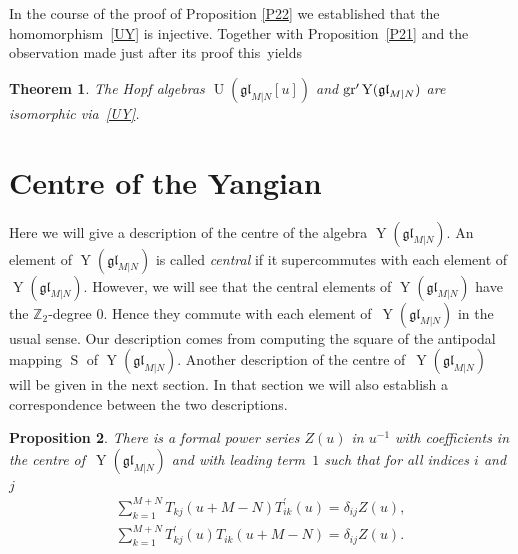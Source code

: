 \documentclass[10pt,a4paper]{amsart}
\numberwithin{equation}{section}
\newtheorem{Theorem}{Theorem}[section]
\newtheorem{Proposition}[Theorem]{Proposition}
\def\g{\glMN [u]}
\def\glMN{\mathfrak{gl}_{M|N}}
\def\grpr{{\rm gr}^{\prime} }
\def\S{\operatorname{S}}
\def\TP{T^{\prime}}
\def\Ug{\operatorname{U}(\g)}
\def\YMN{\operatorname{Y}(\glMN)}
\def\ZZ{\mathbb{Z}}
\begin{document}
In the course of the proof of Proposition \ref{P22} we established that
the homomorphism~\eqref{UY} is injective.
Together with Proposition~\ref{P21}
and the observation made just after its proof this~yields

\begin{Theorem}\label{T18}The Hopf algebras $\Ug$ and $\grpr\YMN$ are isomorphic via~\eqref{UY}.
\end{Theorem}

\section{Centre of the Yangian}\label{sec:2}

Here we will give a description of the centre of the
algebra $\YMN $. An element of $\YMN$ is called
\emph {central} if it supercommutes with each element of $\YMN $.
However, we will see that the central elements of $\YMN$ have
the $\ZZ_{2}$-degree $0 $.
Hence they commute with each
element of~$\YMN$ in the usual sense.
Our description comes from computing the square of the antipodal mapping $\S$ of $\YMN $.
Another description of the centre of~$\YMN $ will be
given in the next section. In that section we will also establish a
correspondence between the two descriptions.

\begin{Proposition}\label{zu} There is a formal power series $Z(u)$ in $u^{-1}$ with coefficients in
the centre of~$\YMN$ and with
leading term~$1$ such that for all indices $i$ and $j$
\begin{gather}\label{zetav}
\sum_{k=1}^{M+N}T_{kj}(u+M-N) \TP_{ik}(u) =\delta_{ij} Z(u) ,\\
\label{zetau}
\sum_{k=1}^{M+N}
\TP_{kj}(u) T_{ik}(u+M-N) =\delta_{ij} Z(u) .
\end{gather}
\end{Proposition}
\end{document}

